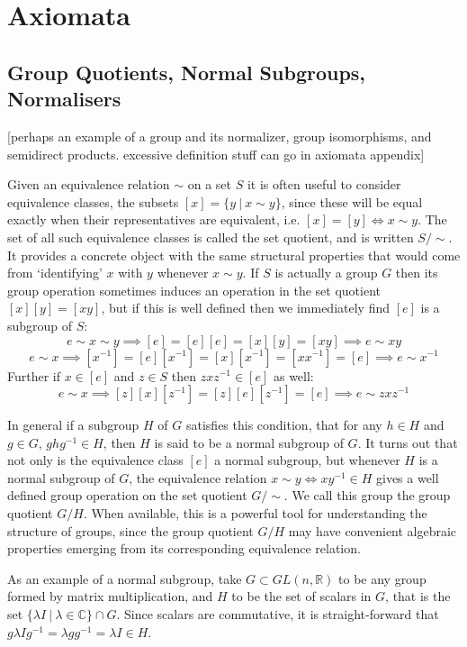 
\chapter[AXIOMATA]{Axiomata}

\section{Group Quotients, Normal Subgroups, Normalisers}
[perhaps an example of a group and its normalizer, group isomorphisms, and semidirect products. excessive definition stuff can go in axiomata appendix]

Given an equivalence relation $\sim$ on a set $S$ it is often useful to consider equivalence classes, the subsets $[x] = \{y\ |\ x \sim y\}$, since these will be equal exactly when their representatives are equivalent, i.e. $[x] = [y] \iff x \sim y$. The set of all such equivalence classes is called the set quotient, and is written $S/\sim$. It provides a concrete object with the same structural properties that would come from `identifying' $x$ with $y$ whenever $x \sim y$. If $S$ is actually a group $G$ then its group operation sometimes induces an operation in the set quotient $[x][y] = [xy]$, but if this is well defined then we immediately find $[e]$ is a subgroup of $S$:
\[e \sim x \sim y \implies [e] = [e][e] = [x][y] = [xy] \implies e \sim xy\]
\[e \sim x \implies [x^{-1}] = [e][x^{-1}] = [x][x^{-1}] = [xx^{-1}] = [e] \implies e \sim x^{-1}\]
Further if $x \in [e]$ and $z \in S$ then $zxz^{-1} \in [e]$ as well:
\[e \sim x \implies [z][x][z^{-1}] = [z][e][z^{-1}] = [e] \implies e \sim zxz^{-1}\]

In general if a subgroup $H$ of $G$ satisfies this condition, that for any $h \in H$ and $g \in G$, $ghg^{-1} \in H$, then $H$ is said to be a normal subgroup of $G$. It turns out that not only is the equivalence class $[e]$ a normal subgroup, but whenever $H$ is a normal subgroup of $G$, the equivalence relation $x \sim y \iff xy^{-1} \in H$ gives a well defined group operation on the set quotient $G/\sim$. We call this group the group quotient $G/H$. When available, this is a powerful tool for understanding the structure of groups, since the group quotient $G/H$ may have convenient algebraic properties emerging from its corresponding equivalence relation.

As an example of a normal subgroup, take $G \subset GL(n, \mathbb{R})$ to be any group formed by matrix multiplication, and $H$ to be the set of scalars in $G$, that is the set $\{\lambda I\ |\ \lambda \in \mathbb{C}\} \cap G$. Since scalars are commutative, it is straight-forward that $g\lambda I g^{-1} = \lambda gg^{-1} = \lambda I \in H$.

